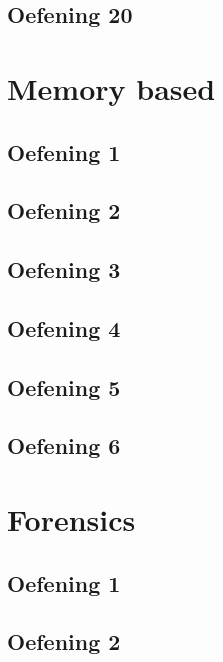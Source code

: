 \documentclass[a4paper,11pt]{report}
\begin{document}
\section{Oefening 20}


\newpage

\chapter{Memory based}
\section{Oefening 1}

\section{Oefening 2}

\section{Oefening 3}

\section{Oefening 4}

\section{Oefening 5}

\section{Oefening 6}


\newpage

\chapter{Forensics}
\section{Oefening 1}

\section{Oefening 2}

\end{document}
